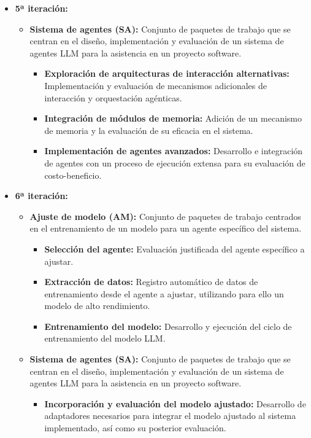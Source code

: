 \begin{itemize}
\begin{itemize}
\begin{itemize}
        \end{itemize}
    \end{itemize}
  \item\textbf{5ª iteración:}
    \begin{itemize}
      \item\textbf{Sistema de agentes (SA): }Conjunto de paquetes de trabajo que se centran en el diseño, implementación y evaluación de un sistema de agentes LLM para la asistencia en un proyecto software.
        \begin{itemize}
          \item\textbf{Exploración de arquitecturas de interacción alternativas: }Implementación y evaluación de mecanismos adicionales de interacción y orquestación agénticas.
          \item\textbf{Integración de módulos de memoria: }Adición de un mecanismo de memoria y la evaluación de su eficacia en el sistema. 
          \item\textbf{Implementación de agentes avanzados: }Desarrollo e integración de agentes con un proceso de ejecución extensa para su evaluación de costo-beneficio. 
        \end{itemize}
    \end{itemize}
  \item\textbf{6ª iteración:}
    \begin{itemize}
      \item\textbf{Ajuste de modelo (AM): }Conjunto de paquetes de trabajo centrados en el entrenamiento de un modelo para un agente específico del sistema.
      \begin{itemize}
        \item\textbf{Selección del agente: }Evaluación justificada del agente específico a ajustar.
        \item\textbf{Extracción de datos: }Registro automático de datos de entrenamiento desde el agente a ajustar, utilizando para ello un modelo de alto rendimiento.
        \item\textbf{Entrenamiento del modelo: }Desarrollo y ejecución del ciclo de entrenamiento del modelo LLM.
      \end{itemize}
      \item\textbf{Sistema de agentes (SA): }Conjunto de paquetes de trabajo que se centran en el diseño, implementación y evaluación de un sistema de agentes LLM para la asistencia en un proyecto software.
        \begin{itemize}
          \item\textbf{Incorporación y evaluación del modelo ajustado: }Desarrollo de adaptadores necesarios para integrar el modelo ajustado al sistema implementado, así como su posterior evaluación.

\end{itemize}
\end{itemize}
\end{itemize}
